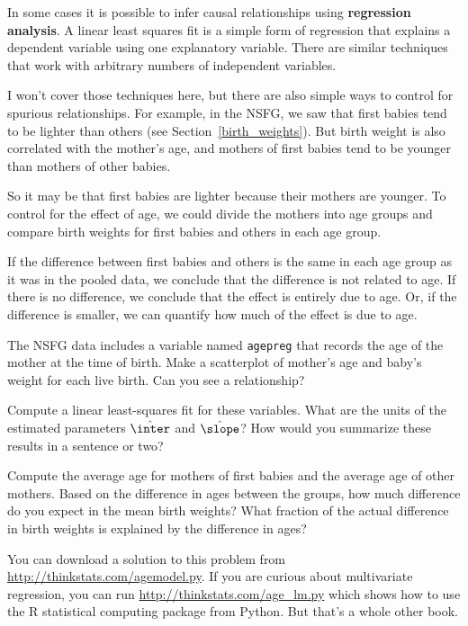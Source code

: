 \documentclass[12pt]{book}
\begin{document}
In some cases it is possible to infer causal relationships using {\bf
  regression analysis}.  A linear least squares fit
is a simple form of regression that explains a dependent
variable using one explanatory variable.  There are similar
techniques that work with arbitrary numbers of independent variables.

I won't cover those techniques here, but there are also simple ways to
control for spurious relationships.  For example, in the NSFG, we saw
that first babies tend to be lighter than others (see
Section~\ref{birth_weights}).  But birth weight is also correlated
with the mother's age, and mothers of first babies tend to be younger
than mothers of other babies.

So it may be that first babies are lighter because their mothers are
younger.  To control for the effect of age, we could divide the mothers
into age groups and compare birth weights for first babies and others
in each age group.

If the difference between first babies and others is the same in
each age group as it was in the pooled data, we conclude
that the difference is not related to age.  If there is no difference,
we conclude that the effect is entirely due to age.  Or,
if the difference is smaller, we can quantify how much of the effect
is due to age.

\begin{exercise}
The NSFG data includes a variable named {\tt agepreg} that records
the age of the mother at the time of birth.
Make a scatterplot of mother's age and baby's weight for each live
birth.  Can you see a relationship?

Compute a linear least-squares fit for these variables.  What are the
units of the estimated parameters $\hat{\inter}$ and $\hat{\slope}$?
How would you summarize these results in a sentence or two?

Compute the average age for mothers of first babies and the average
age of other mothers.  Based on the difference in ages between the
groups, how much difference do you expect in the mean birth weights?
What fraction of the actual difference in birth weights is explained
by the difference in ages?

You can download a solution to this problem from
\url{http://thinkstats.com/agemodel.py}.  If you are curious about
multivariate regression, you can run \url{http://thinkstats.com/age_lm.py}
which shows how to use the R statistical computing package from
Python.  But that's a whole other book.

\end{exercise}
\end{document}
